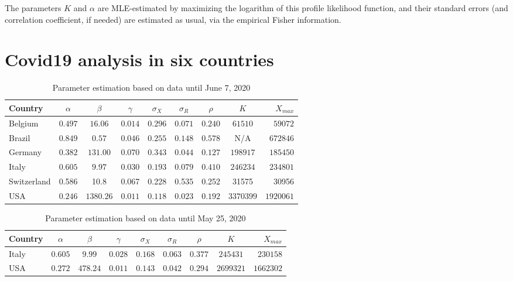 \documentclass{article}
\begin{document}
\bigskip

The parameters $K$ and $\alpha$ are MLE-estimated by maximizing the logarithm of this profile likelihood function, and their standard errors (and correlation coefficient, if needed) are estimated as usual, via the empirical Fisher information.


\section{Covid19 analysis in six countries} \label{Covid19}

\begin{table}
\begin{center}
\begin{tabular}{l|ccccccc|r}
Country & $\alpha$ & $\beta$ & $\gamma$ & $\sigma_X $ & $ \sigma_R$ & $\rho$ & $K$ & $X_{max}$ \\ \hline
Belgium & $0.497$ & $16.06$ & $0.014$ & $0.296$ & $0.071$ & $0.240$ & $61510$ & $59072$ \\
Brazil  & $0.849$ & $0.57$ & $0.046$ & $0.255$ & $0.148$ & $0.578$ & N/A & $672846$ \\
Germany & $0.382$ & $131.00$ & $0.070$ & $0.343$ & $0.044$ & $0.127$ & $198917$ & $185450$ \\
Italy  & $0.605$ & $9.97$ & $0.030$ & $0.193$ & $0.079$ & $0.410$ & $246234$ & $234801$ \\
Switzerland & 0.586 & 10.8 & 0.067 & 0.228  & 0.535 & 0.252 & 31575&      30956	    \\
USA    & $0.246$  & $1380.26$ & $0.011$ & $0.118$ & $0.023$ & $0.192$ & $3370399$ & $1920061$ \\ \hline
\end{tabular}
\caption{
Parameter estimation based on data until June 7, 2020
\label{tablejune7}
}
\end{center}
\end{table}

\bigskip

\begin{table}
\begin{center}
\begin{tabular}{l|ccccccc|r}
Country & $\alpha$ & $\beta$ & $\gamma$ & $\sigma_X $ & $ \sigma_R$ & $\rho$ & $K$ & $X_{max}$ \\ \hline
Italy  & $0.605$ & $9.99$ & $0.028$ & $0.168$ & $0.063$ & $0.377$ & $245431$ & $230158$ \\
USA    & $0.272$  & $478.24$ & $0.011$ & $0.143$ & $0.042$ & $0.294$ & $2699321$ & $1662302$\\ \hline
\end{tabular}
\caption{
Parameter estimation based on data until May 25, 2020
\label{tablemay25}
}
\end{center}
\end{table}
\end{document}
